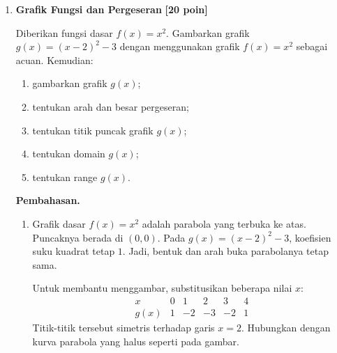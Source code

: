 \documentclass[12pt,a4paper]{article}
\newcommand{\pembahasan}{\par\medskip\textbf{Pembahasan.}\par\smallskip}
\newcommand{\poin}[1]{\hfill\textbf{[#1 poin]}}
\begin{document}
\begin{enumerate}
  \newpage
  \item \textbf{Grafik Fungsi dan Pergeseran} \poin{20}

    Diberikan fungsi dasar $f(x)=x^2$.
    Gambarkan grafik $g(x)=(x-2)^2-3$ dengan menggunakan grafik $f(x)=x^2$ sebagai acuan.
    Kemudian:
    \begin{enumerate}
      \item gambarkan grafik $g(x)$;
      \item tentukan arah dan besar pergeseran;
      \item tentukan titik puncak grafik $g(x)$;
      \item tentukan domain $g(x)$;
      \item tentukan range $g(x)$.
    \end{enumerate}

    \begingroup
    \setlength{\abovedisplayskip}{6pt}
    \setlength{\belowdisplayskip}{6pt}
    \setlength{\abovedisplayshortskip}{4pt}
    \setlength{\belowdisplayshortskip}{4pt}
    \pembahasan
    \begin{enumerate}
      \item Grafik dasar $f(x)=x^2$ adalah parabola yang terbuka ke atas.
        Puncaknya berada di $(0,0)$.
        Pada $g(x)=(x-2)^2-3$, koefisien suku kuadrat tetap $1$.
        Jadi, bentuk dan arah buka parabolanya tetap sama.

        Untuk membantu menggambar, substitusikan beberapa nilai $x$:
        \[
          \begin{array}{c|rrrrr}
            x & 0 & 1 & 2 & 3 & 4\\ \hline
            g(x) & 1 & -2 & -3 & -2 & 1
          \end{array}
        \]
        Titik-titik tersebut simetris terhadap garis $x=2$.
        Hubungkan dengan kurva parabola yang halus seperti pada gambar.

        \begin{center}
        \end{center}


\end{enumerate}
\end{enumerate}
\end{document}
